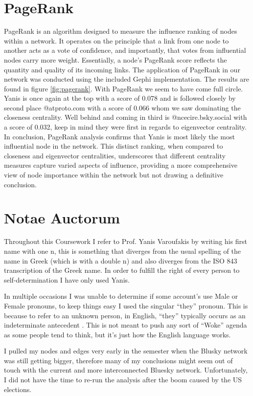 \documentclass[
	a4paper, %
	12pt, %
	twoside, %
]{LTJournalArticle}
\begin{document}
\section{PageRank}
PageRank is an algorithm designed to measure the influence ranking of nodes within a network.  It operates on the principle that a link from one node to another acts as a vote of confidence, and importantly, that votes from influential nodes carry more weight. Essentially, a node's PageRank score reflects the quantity and quality of its incoming links. The application of PageRank in our network was conducted using the included Gephi implementation. The results are found in figure \ref{fig:pagerank}. With PageRank we seem to have come full circle. Yanis is once again at the top with a score of 0.078 and is followed closely by second place @atproto.com with a score of 0.066 whom we saw dominating the closeness centrality. Well behind and coming in third is @ncecire.bsky.social with a score of 0.032, keep in mind they were first in regards to eigenvector centrality.\\
In conclusion, PageRank analysis confirms that Yanis is most likely the most influential node in the network.  This distinct ranking, when compared to closeness and eigenvector centralities, underscores that different centrality measures capture varied aspects of influence, providing a more comprehensive view of node importance within the network but not drawing a definitive conclusion.

\section{Notae Auctorum}
Throughout this Coursework I refer to Prof. Yanis Varoufakis by writing his first name with one n, this is something that diverges from the usual spelling of the name in Greek (which is with a double n) and also diverges from the ISO 843 transcription of the Greek name. In order to fulfill the right of every person to self-determination I have only used Yanis.

In multiple occasions I was unable to determine if some account’s use Male or Female pronouns, to keep things easy I used the singular “they” pronoun. This is because to refer to an unknown person, in English, “they” typically occurs as an indeterminate antecedent \autocite{di1996american}. This is not meant to push any sort of “Woke” agenda as some people tend to think, but it’s just how the English language works.

I pulled my nodes and edges very early in the semester when the Blusky network was still getting bigger, therefore many of my conclusions might seem out of touch with the current and more interconnected Bluesky network. Unfortunately, I did not have the time to re-run the analysis after the boom caused by the US elections.
\end{document}
